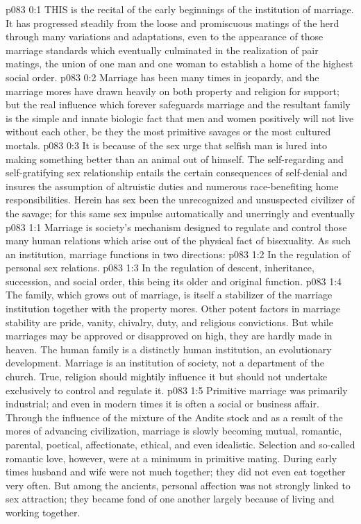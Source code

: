 \vs p083 0:1 THIS is the recital of the early beginnings of the institution of marriage. It has progressed steadily from the loose and promiscuous matings of the herd through many variations and adaptations, even to the appearance of those marriage standards which eventually culminated in the realization of pair matings, the union of one man and one woman to establish a home of the highest social order.
\vs p083 0:2 Marriage has been many times in jeopardy, and the marriage mores have drawn heavily on both property and religion for support; but the real influence which forever safeguards marriage and the resultant family is the simple and innate biologic fact that men and women positively will not live without each other, be they the most primitive savages or the most cultured mortals.
\vs p083 0:3 It is because of the sex urge that selfish man is lured into making something better than an animal out of himself. The self\hyp{}regarding and self\hyp{}gratifying sex relationship entails the certain consequences of self\hyp{}denial and insures the assumption of altruistic duties and numerous race\hyp{}benefiting home responsibilities. Herein has sex been the unrecognized and unsuspected civilizer of the savage; for this same sex impulse automatically and unerringly  and eventually 
\vs p083 1:1 Marriage is society’s mechanism designed to regulate and control those many human relations which arise out of the physical fact of bisexuality. As such an institution, marriage functions in two directions:
\vs p083 1:2 \bibnobreakspace In the regulation of personal sex relations.
\vs p083 1:3 \bibnobreakspace In the regulation of descent, inheritance, succession, and social order, this being its older and original function.
\vs p083 1:4 \pc The family, which grows out of marriage, is itself a stabilizer of the marriage institution together with the property mores. Other potent factors in marriage stability are pride, vanity, chivalry, duty, and religious convictions. But while marriages may be approved or disapproved on high, they are hardly made in heaven. The human family is a distinctly human institution, an evolutionary development. Marriage is an institution of society, not a department of the church. True, religion should mightily influence it but should not undertake exclusively to control and regulate it.
\vs p083 1:5 Primitive marriage was primarily industrial; and even in modern times it is often a social or business affair. Through the influence of the mixture of the Andite stock and as a result of the mores of advancing civilization, marriage is slowly becoming mutual, romantic, parental, poetical, affectionate, ethical, and even idealistic. Selection and so\hyp{}called romantic love, however, were at a minimum in primitive mating. During early times husband and wife were not much together; they did not even eat together very often. But among the ancients, personal affection was not strongly linked to sex attraction; they became fond of one another largely because of living and working together.
